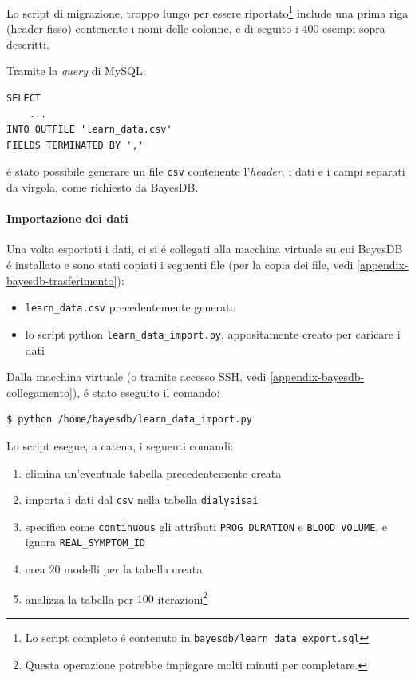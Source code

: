 \documentclass[preprint]{acm_proc_article-sp}
\begin{document}
Lo script di migrazione, troppo lungo per essere riportato\footnote{Lo script completo \'e contenuto in \verb|bayesdb/learn_data_export.sql|} include una prima riga (header fisso) contenente i nomi delle colonne, e di seguito i $400$ esempi sopra descritti.

Tramite la \textit{query} di MySQL:
\begin{verbatim}
SELECT
	...
INTO OUTFILE 'learn_data.csv'
FIELDS TERMINATED BY ','
\end{verbatim}
\'e stato possibile generare un file \verb|csv| contenente l'\textit{header}, i dati e i campi separati da virgola, come richiesto da BayesDB.

\paragraph{Importazione dei dati}
Una volta esportati i dati, ci si \'e collegati alla macchina virtuale su cui BayesDB \'e installato e sono stati copiati i seguenti file (per la copia dei file, vedi \ref{appendix-bayesdb-trasferimento}):
\begin{itemize}
\item \verb|learn_data.csv| precedentemente generato
\item lo script python \verb|learn_data_import.py|, appositamente creato per caricare i dati
\end{itemize}

Dalla macchina virtuale (o tramite accesso SSH, vedi \ref{appendix-bayesdb-collegamento}), \'e stato eseguito il comando:
\begin{verbatim}
$ python /home/bayesdb/learn_data_import.py
\end{verbatim}

Lo script esegue, a catena, i seguenti comandi:
\begin{enumerate}
\item elimina un'eventuale tabella precedentemente creata
\item importa i dati dal \verb|csv| nella tabella \verb|dialysisai|
\item specifica come \verb|continuous| gli attributi \verb|PROG_DURATION| e \verb|BLOOD_VOLUME|, e ignora \verb|REAL_SYMPTOM_ID|
\item crea $20$ modelli per la tabella creata
\item analizza la tabella per $100$ iterazioni\footnote{Questa operazione potrebbe impiegare molti minuti per completare.}
\end{enumerate}
\end{document}
